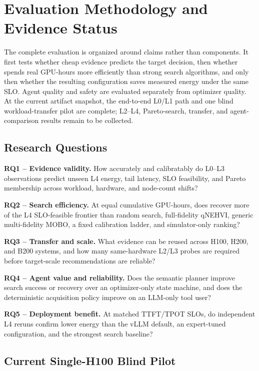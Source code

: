\section{Evaluation Methodology and Evidence Status}

The complete evaluation is organized around claims rather than components.  It
first tests whether cheap evidence predicts the target decision, then whether
\ipig{} spends real GPU-hours more efficiently than strong search algorithms,
and only then whether the resulting configuration saves measured energy under
the same SLO.  Agent quality and safety are evaluated separately from optimizer
quality.  At the current artifact snapshot, the end-to-end L0/L1 path and one
blind workload-transfer pilot are complete; L2--L4, Pareto-search, transfer,
and agent-comparison results remain to be collected.

\subsection{Research Questions}

\textbf{RQ1 -- Evidence validity.}  How accurately and calibratably do L0--L3
observations predict unseen L4 energy, tail latency, SLO feasibility, and
Pareto membership across workload, hardware, and node-count shifts?

\textbf{RQ2 -- Search efficiency.}  At equal cumulative GPU-hours, does \ipig{}
recover more of the L4 SLO-feasible frontier than random search, full-fidelity
qNEHVI, generic multi-fidelity MOBO, a fixed calibration ladder, and
simulator-only ranking?

\textbf{RQ3 -- Transfer and scale.}  What evidence can be reused across H100,
H200, and B200 systems, and how many same-hardware L2/L3 probes are required
before target-scale recommendations are reliable?

\textbf{RQ4 -- Agent value and reliability.}  Does the semantic planner improve
search success or recovery over an optimizer-only state machine, and does the
deterministic acquisition policy improve on an LLM-only tool user?

\textbf{RQ5 -- Deployment benefit.}  At matched TTFT/TPOT SLOs, do independent
L4 reruns confirm lower energy than the vLLM default, an expert-tuned
configuration, and the strongest search baseline?

\subsection{Current Single-H100 Blind Pilot}

